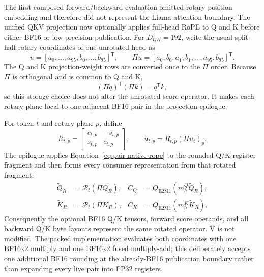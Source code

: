 The first composed forward/backward evaluation omitted rotary position
embedding and therefore did not represent the Llama attention boundary.  The
unified QKV projection now optionally applies full-head RoPE to Q and K before
either BF16 or low-precision publication.  For $D_{QK}=192$, write the usual
split-half rotary coordinates of one unrotated head as
\begin{equation}
  u=[a_0,\ldots,a_{95},b_0,\ldots,b_{95}]^{\mathsf T},
  \qquad
  \Pi u=[a_0,b_0,a_1,b_1,\ldots,a_{95},b_{95}]^{\mathsf T}.
  \label{eq:rope-pair-permutation}
\end{equation}
The Q and K projection-weight rows are converted once to the $\Pi$ order.
Because $\Pi$ is orthogonal and is common to Q and K,
\begin{equation}
  (\Pi q)^{\mathsf T}(\Pi k)=q^{\mathsf T}k,
  \label{eq:rope-permutation-dot-invariance}
\end{equation}
so this storage choice does not alter the unrotated score operator.  It makes
each rotary plane local to one adjacent BF16 pair in the projection epilogue.

For token $t$ and rotary plane $p$, define
\begin{equation}
  R_{t,p}=
  \begin{bmatrix}
    c_{t,p} & -s_{t,p}\\
    s_{t,p} &  c_{t,p}
  \end{bmatrix},
  \qquad
  \widetilde u_{t,p}=R_{t,p}(\Pi u_t)_p.
  \label{eq:pair-native-rope}
\end{equation}
The epilogue applies Equation~\ref{eq:pair-native-rope} to the rounded Q/K
register fragment and then forms every consumer representation from that
rotated fragment:
\begin{align}
  \widetilde Q_R&=\mathcal R_t(\Pi Q_R),
  &C_Q&=Q_{\mathrm{E2M1}}(m^Q_h\widetilde Q_R),\\
  \widetilde K_R&=\mathcal R_t(\Pi K_R),
  &C_K&=Q_{\mathrm{E2M1}}(m^K_h\widetilde K_R).
  \label{eq:projection-rope-then-quantize}
\end{align}
Consequently the optional BF16 Q/K tensors, forward score operands, and all
backward Q/K byte layouts represent the same rotated operator.  V is not
modified.  The packed implementation evaluates both coordinates with one
BF16x2 multiply and one BF16x2 fused multiply-add; this deliberately accepts
one additional BF16 rounding at the already-BF16 publication boundary rather
than expanding every live pair into FP32 registers.

